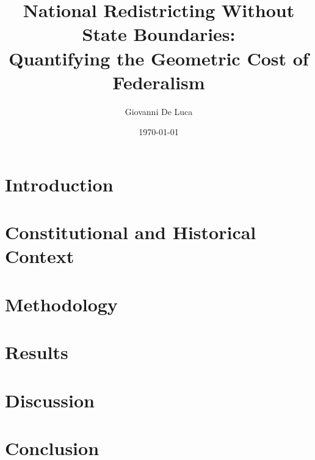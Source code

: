 \documentclass[11pt]{article}
\title{National Redistricting Without State Boundaries: \\
Quantifying the Geometric Cost of Federalism}
\author{Giovanni De Luca}
\date{\today}
\begin{document}
\maketitle

\begin{abstract}

\end{abstract}

\section{Introduction}


\section{Constitutional and Historical Context}


\section{Methodology}


\section{Results}


\section{Discussion}


\section{Conclusion}




\end{document}

